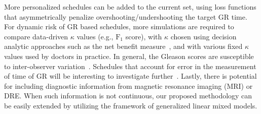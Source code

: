 More personalized schedules can be added to the current set, using loss functions that asymmetrically penalize overshooting/undershooting the target GR time. For dynamic risk of GR based schedules, more simulations are required to compare data-driven $\kappa$ values (e.g., $\mbox{F}_1$ score), with $\kappa$ chosen using decision analytic approaches such as the net benefit measure~\citep{vickers2006decision}, and with various fixed $\kappa$ values used by doctors in practice. In general, the Gleason scores are susceptible to inter-observer variation~\citep{Gleason_interobs_var}. Schedules that account for error in the measurement of time of GR will be interesting to investigate further~\citep{coley2017}. Lastly, there is potential for including diagnostic information from magnetic resonance imaging (MRI) or DRE. When such information is not continuous, our proposed methodology can be easily extended by utilizing the framework of generalized linear mixed models.